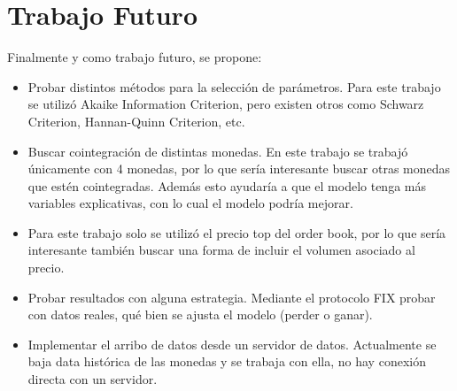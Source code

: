 \section{Trabajo Futuro}
Finalmente y como trabajo futuro, se propone:
\begin{itemize}
 \item Probar distintos métodos para la selección de parámetros. Para este
trabajo se utilizó Akaike Information Criterion, pero existen otros como
Schwarz Criterion, Hannan-Quinn Criterion, etc.
 \item Buscar cointegración de distintas monedas. En este trabajo se trabajó
únicamente con 4 monedas, por lo que sería interesante buscar otras monedas que
estén cointegradas. Además esto ayudaría a que el modelo tenga más variables
explicativas, con lo cual el modelo podría mejorar.
 \item Para este trabajo solo se utilizó el precio top del order book,
por lo que sería interesante también buscar una forma de incluir el volumen
asociado al precio.
 \item Probar resultados con alguna estrategia. Mediante el protocolo FIX
probar con datos reales, qué bien se ajusta el modelo (perder o ganar).
 \item Implementar el arribo de datos desde un servidor de datos. Actualmente
se baja data histórica de las monedas y se trabaja con ella, no hay conexión
directa con un servidor.
\end{itemize}

